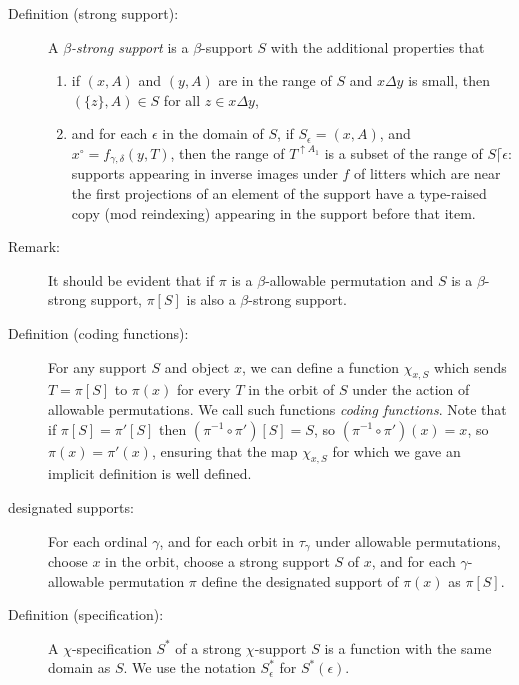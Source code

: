 \documentclass[112pt]{article}
\begin{document}
\begin{description}

\item[Definition (strong support):]  A {\em $\beta$-strong support\/} is a $\beta$-support $S$ with the additional properties that

\begin{enumerate}

\item if $(x,A)$ and $(y,A)$ are in the range of $S$ and $x \Delta y$ is small, then $(\{z\},A) \in S$ for all $z \in x \Delta y$, 

\item and for each $\epsilon$ in the domain of $S$, if $S_\epsilon = (x,A)$, and $x^\circ = f_{\gamma,\delta}(y,T)$, then the range of $T^{\uparrow A_1}$ is a subset of the range of $S \lceil \epsilon$:  supports appearing in inverse images under $f$ of litters which are near the first projections of an element of the support have a type-raised copy (mod reindexing) appearing in the support before that item.
\end{enumerate}


\item[Remark:]  It should be evident that if $\pi$ is a $\beta$-allowable permutation and $S$ is a $\beta$-strong support,
$\pi[S]$ is also a $\beta$-strong support.


\item[Definition (coding functions):]  For any support $S$ and object $x$, we can define a function $\chi_{x,S}$ which sends $T=\pi[S]$ to $\pi(x)$ for every $T$ in the orbit of $S$ under
the action of allowable permutations.  We call such functions {\em coding functions\/}.  Note that if $\pi[S]=\pi'[S]$ then $(\pi^{-1}\circ \pi')[S]= S$, so 
$(\pi^{-1}\circ \pi')(x)= x$, so $\pi(x)=\pi'(x)$, ensuring that the map $\chi_{x,S}$ for which we gave an implicit definition is well defined.

\item[designated supports:]  For each ordinal $\gamma$, and for each orbit in $\tau_\gamma$ under allowable permutations, choose $x$ in the orbit, choose a strong support $S$ of $x$, and for each $\gamma$-allowable permutation
$\pi$ define the designated support of $\pi(x)$ as $\pi[S]$. 

\item[Definition (specification):]  A $\chi$-specification $S^*$ of a strong $\chi$-support $S$ is a function with the same domain as $S$.  We use the notation $S^*_\epsilon$ for $S^*(\epsilon)$.


\end{description}
\end{document}
